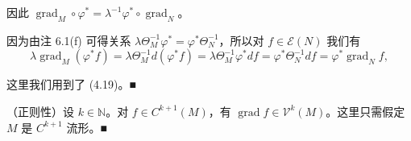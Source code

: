 \begin{remark}
\begin{items}
因此 $ \operatorname{grad}_{M} \circ \varphi^{*} = \lambda^{-1}\varphi^{*} \circ \operatorname{grad}_{N} $。

\proofhead
因为由注 6.1(f) 可得关系 $ \lambda\Theta_{M}^{-1}\varphi^{*} = \varphi^{*}\Theta_{N}^{-1} $，所以对 $ f \in \mathcal{E}(N) $ 我们有
\[
\lambda\operatorname{grad}_{M}(\varphi^{*}f) = \lambda\Theta_{M}^{-1}d(\varphi^{*}f) = \lambda\Theta_{M}^{-1}\varphi^{*}df = \varphi^{*}\Theta_{N}^{-1}df = \varphi^{*}\operatorname{grad}_{N} f,
\]

这里我们用到了 (4.19)。\nobreak\hspace{0.35em}■

\item

（正则性）设 $ k \in \mathbb{N} $。对 $ f \in C^{k+1}(M) $，有 $ \operatorname{grad} f \in \mathcal{V}^{k}(M) $。这里只需假定 $ M $ 是 $ C^{k+1} $ 流形。\nobreak\hspace{0.35em}■

\end{items}

\end{remark}

